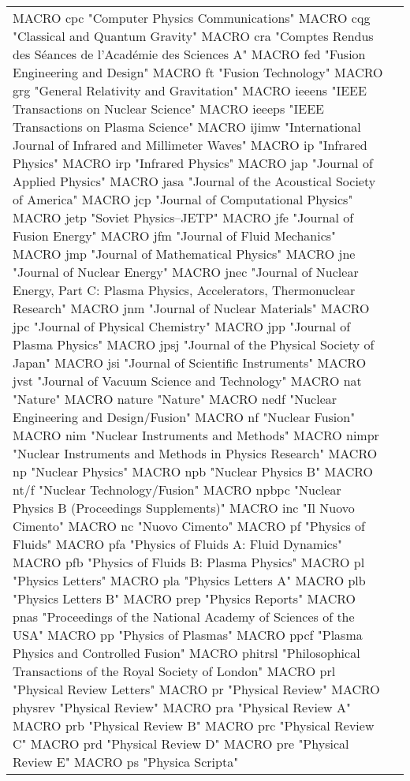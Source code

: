 \documentclass{article}
\begin{document}
\begin{longtable}{lp{6cm}}
MACRO {cpc} {"Computer Physics Communications"}
MACRO {cqg} {"Classical and Quantum Gravity"}
MACRO {cra} {"Comptes Rendus des S{\'e}ances de l'Acad{\'e}mie des Sciences A"}
MACRO {fed} {"Fusion Engineering and Design"}
MACRO {ft} {"Fusion Technology"}
MACRO {grg} {"General Relativity and Gravitation"}
MACRO {ieeens} {"IEEE Transactions on Nuclear Science"}
MACRO {ieeeps} {"IEEE Transactions on Plasma Science"}
MACRO {ijimw} {"International Journal of Infrared and Millimeter Waves"}
MACRO {ip} {"Infrared Physics"}
MACRO {irp} {"Infrared Physics"}
MACRO {jap} {"Journal of Applied Physics"}
MACRO {jasa} {"Journal of the Acoustical Society of America"}
MACRO {jcp} {"Journal of Computational Physics"}
MACRO {jetp} {"Soviet Physics--JETP"}
MACRO {jfe} {"Journal of Fusion Energy"}
MACRO {jfm} {"Journal of Fluid Mechanics"}
MACRO {jmp} {"Journal of Mathematical Physics"}
MACRO {jne} {"Journal of Nuclear Energy"}
MACRO {jnec} {"Journal of Nuclear Energy, Part C: Plasma Physics, Accelerators, Thermonuclear Research"}
MACRO {jnm} {"Journal of Nuclear Materials"}
MACRO {jpc} {"Journal of Physical Chemistry"}
MACRO {jpp} {"Journal of Plasma Physics"}
MACRO {jpsj} {"Journal of the Physical Society of Japan"}
MACRO {jsi} {"Journal of Scientific Instruments"}
MACRO {jvst} {"Journal of Vacuum Science and Technology"}
MACRO {nat} {"Nature"}
MACRO {nature} {"Nature"}
MACRO {nedf} {"Nuclear Engineering and Design/Fusion"}
MACRO {nf} {"Nuclear Fusion"}
MACRO {nim} {"Nuclear Instruments and Methods"}
MACRO {nimpr} {"Nuclear Instruments and Methods in Physics Research"}
MACRO {np} {"Nuclear Physics"}
MACRO {npb} {"Nuclear Physics B"}
MACRO {nt/f} {"Nuclear Technology/Fusion"}
MACRO {npbpc} {"Nuclear Physics B (Proceedings Supplements)"}
MACRO {inc} {"Il Nuovo Cimento"}
MACRO {nc} {"Nuovo Cimento"}
MACRO {pf} {"Physics of Fluids"}
MACRO {pfa} {"Physics of Fluids A: Fluid Dynamics"}
MACRO {pfb} {"Physics of Fluids B: Plasma Physics"}
MACRO {pl} {"Physics Letters"}
MACRO {pla} {"Physics Letters A"}
MACRO {plb} {"Physics Letters B"}
MACRO {prep} {"Physics Reports"}
MACRO {pnas} {"Proceedings of the National Academy of Sciences of the USA"}
MACRO {pp} {"Physics of Plasmas"}
MACRO {ppcf} {"Plasma Physics and Controlled Fusion"}
MACRO {phitrsl} {"Philosophical Transactions of the Royal Society of London"}
MACRO {prl} {"Physical Review Letters"}
MACRO {pr} {"Physical Review"}
MACRO {physrev} {"Physical Review"}
MACRO {pra} {"Physical Review A"}
MACRO {prb} {"Physical Review B"}
MACRO {prc} {"Physical Review C"}
MACRO {prd} {"Physical Review D"}
MACRO {pre} {"Physical Review E"}
MACRO {ps} {"Physica Scripta"}

\end{longtable}
\end{document}
